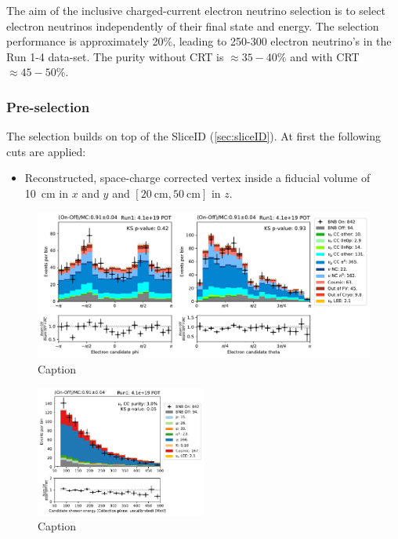 \label{sec:nueselection:inclusive}

The aim of the inclusive charged-current electron neutrino selection is to select electron neutrinos independently of their final state and energy. The selection performance is approximately 20\%, leading to 250-300 electron neutrino's in the Run 1-4 data-set. The purity without CRT is $\approx 35-40\%$ and with CRT $\approx 45-50\%$.

\subsubsection{Pre-selection}
The selection builds on top of the SliceID (\cref{sec:sliceID}). At first the following cuts are applied:
\begin{itemize}
    \item Reconstructed, space-charge corrected vertex inside a fiducial volume of \SI{10}{\cm} in $x$ and $y$ and $[ \SI{20}{\cm}, \SI{50}{\cm}]$ in $z$.
\end{itemize}

\begin{figure}
    \centering
    \includegraphics[width=\textwidth]{NueCCsel/Images/run1/pre_angles.pdf}
    \caption{Caption}
    \label{fig:pre_shower_E_pdg}
\end{figure}

\begin{figure}
    \centering
    \includegraphics[width=0.5\textwidth]{NueCCsel/Images/run1/pre_shower_E_pdg.pdf}
    \caption{Caption}
    \label{fig:pre_shower_E_pdg}
\end{figure}

